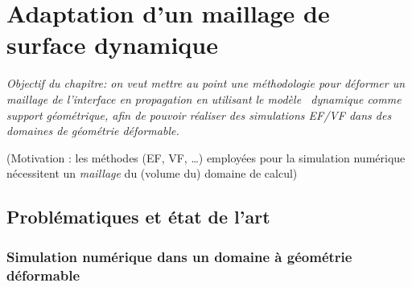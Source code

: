 \chapter{Adaptation d'un maillage de surface dynamique}

\textit{Objectif du chapitre: on veut mettre au point une méthodologie pour déformer un maillage de l'interface en propagation en utilisant le modèle \brep\ dynamique comme support géométrique, afin de pouvoir réaliser des simulations EF/VF dans des domaines de géométrie déformable.}
\par
(Motivation : les méthodes (EF, VF, \ldots) employées pour la simulation numérique nécessitent un \textit{maillage} du (volume du) domaine de calcul)

\section{Problématiques et état de l'art}

\subsection{Simulation numérique dans un domaine à géométrie déformable}

